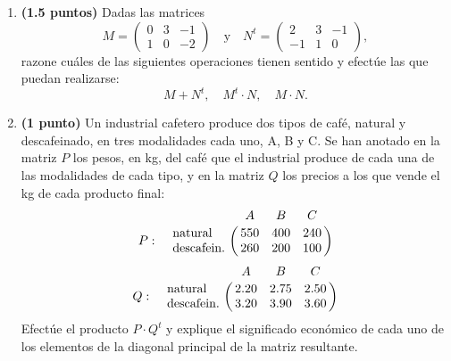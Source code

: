 
\begin{enumerate}[label=\alph*)]
\item \textbf{(1.5 puntos)} Dadas las matrices
\[
M=\begin{pmatrix}0&3&-1\\1&0&-2\end{pmatrix}\quad\text{y}\quad
N^t=\begin{pmatrix}2&3&-1\\-1&1&0\end{pmatrix},
\]
razone cuáles de las siguientes operaciones tienen sentido y efectúe las que puedan realizarse:
\[
M+N^t,\quad M^t\cdot N,\quad M\cdot N.
\]
\item \textbf{(1 punto)} Un industrial cafetero produce dos tipos de café, natural y descafeinado, en tres modalidades cada uno, A, B y C. Se han anotado en la matriz $P$ los pesos, en kg, del café que el industrial produce de cada una de las modalidades de cada tipo, y en la matriz $Q$ los precios a los que vende el kg de cada producto final:
\[
P:\quad\bordermatrix{&A&B&C\cr\text{natural}&550&400&240\cr\text{descafein.}&260&200&100\cr}
\]
\[
Q:\quad\bordermatrix{&A&B&C\cr\text{natural}&2.20&2.75&2.50\cr\text{descafein.}&3.20&3.90&3.60\cr}
\]
Efectúe el producto $P\cdot Q^t$ y explique el significado económico de cada uno de los elementos de la diagonal principal de la matriz resultante.
\end{enumerate}
